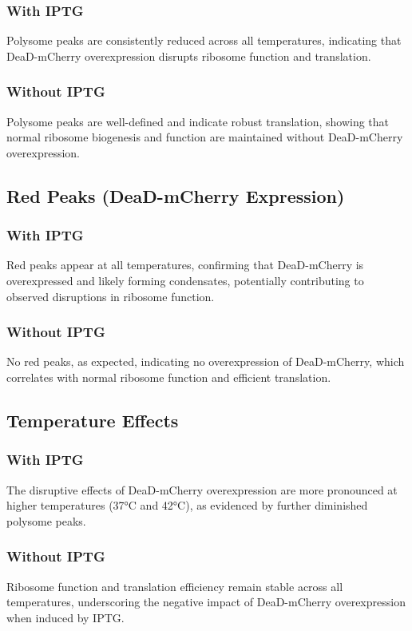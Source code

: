 \documentclass[12pt]{article}
\begin{document}
\subsubsection{With IPTG}
 
Polysome peaks are consistently reduced across all temperatures, indicating that DeaD-mCherry overexpression disrupts ribosome function and translation.

\subsubsection{Without IPTG}


Polysome peaks are well-defined and indicate robust translation, showing that normal ribosome biogenesis and function are maintained without DeaD-mCherry overexpression.


\subsection{Red Peaks (DeaD-mCherry Expression)}


\subsubsection{With IPTG}

Red peaks appear at all temperatures, confirming that DeaD-mCherry is overexpressed and likely forming condensates, potentially contributing to observed disruptions in ribosome function.

\subsubsection{Without IPTG}

No red peaks, as expected, indicating no overexpression of DeaD-mCherry, which correlates with normal ribosome function and efficient translation.

    
\subsection{Temperature Effects}

        
\subsubsection{With IPTG}

The disruptive effects of DeaD-mCherry overexpression are more pronounced at higher temperatures (37°C and 42°C), as evidenced by further diminished polysome peaks.

\subsubsection{Without IPTG}

Ribosome function and translation efficiency remain stable across all temperatures, underscoring the negative impact of DeaD-mCherry overexpression when induced by IPTG.
\end{document}
